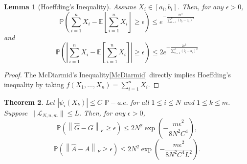 \documentclass{article}[11]
\newtheorem{theorem}{Theorem}
\newtheorem{lemma}[theorem]{Lemma}
\begin{document}
\begin{lemma}[Hoeffding's Inequality]\label{Hoeffding}
	Assume $X_i \in [a_i, b_i]$. Then, for any $\epsilon>0$,
	\[
	\mathbb{P}\left( \sum_{i=1}^n X_i - \mathbb{E}\left[\sum_{i=1}^n X_i\right] \geq \epsilon \right) \leq e^{-\frac{2\epsilon^2}{\sum_{i=1}^n (b_i - a_i)^2}}
	\]
	and
	\[
	\mathbb{P}\left(\left| \sum_{i=1}^n X_i - \mathbb{E}\left[\sum_{i=1}^n X_i\right]\right| \geq \epsilon \right) \leq 2e^{-\frac{2\epsilon^2}{\sum_{i=1}^n (b_i - a_i)^2}}
	\]
\end{lemma}
\begin{proof}
	The McDiarmid's Inequality\eqref{McDiarmid} directly implies Hoeffding's inequality by taking $f(X_1, \ldots, X_n) = \sum_{i=1}^n X_i$.
\end{proof}

\begin{theorem}\label{Gramian_estimation}
	Let $| \psi_i(X_k) | \leq C$ $\mathbb{P}-a.e.$ for all $ 1 \leq i \leq N$ and $1 \leq k \leq m$. Suppose $\| \mathcal{L}_{N,n,m} \| \leq L$. Then, for any $\epsilon>0$, 
	\[
	\mathbb{P} \left( \left\| \widehat{G} - G \right\|_F \geq \epsilon \right) \leq 2N^2 \exp \left( -\frac{m \epsilon^2}{8 N^2 C^4} \right),
	\]
	\[
	\mathbb{P} \left( \left\| \widehat{A} - A \right\|_F \geq \epsilon \right) \leq 2N^2 \exp \left( -\frac{m\epsilon^2}{8 N^2 C^4 L^2} \right).
	\]
\end{theorem}
\end{document}
